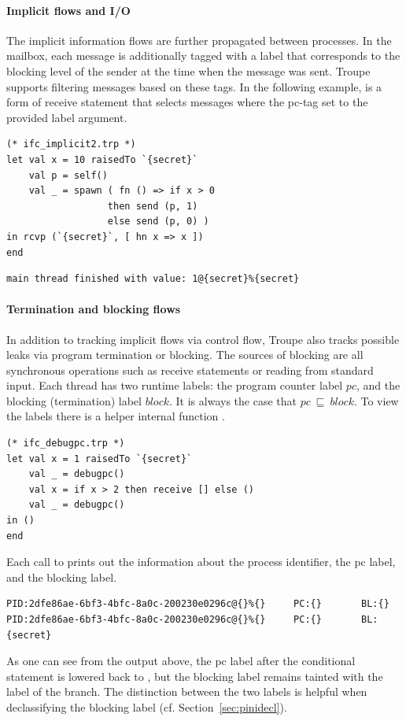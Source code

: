 \paragraph{Implicit flows and I/O}
The implicit information flows are further propagated between processes.
In the mailbox, each message is additionally tagged with a label that
corresponds to the blocking level of the sender at the time when the message was sent.
Troupe supports filtering messages based on these tags.
In the following example,  is a form of receive statement that selects messages
where the pc-tag set to the provided label argument.

\begin{lstlisting}
(* ifc_implicit2.trp *)
let val x = 10 raisedTo `{secret}`
    val p = self()
    val _ = spawn ( fn () => if x > 0
                  then send (p, 1)
                  else send (p, 0) )
in rcvp (`{secret}`, [ hn x => x ])
end
\end{lstlisting}
\begin{verbatim}
main thread finished with value: 1@{secret}%{secret}
\end{verbatim}


\paragraph{Termination and blocking flows}
In addition to tracking implicit flows via control flow, Troupe also
tracks possible leaks via program termination or blocking.
The sources of blocking are all synchronous operations such as receive statements or reading from standard input.
Each thread has two runtime labels: the program counter label $\mathit{pc}$, and
the blocking (termination) label $\mathit{block}$. It is always the case that
$\mathit{pc}~\sqsubseteq~\mathit{block}$. To view the labels there is a
helper internal function .
\begin{lstlisting}
(* ifc_debugpc.trp *)
let val x = 1 raisedTo `{secret}`
    val _ = debugpc()
    val x = if x > 2 then receive [] else ()
    val _ = debugpc()
in ()
end
\end{lstlisting}

Each call to  prints out the information about the process identifier,
the pc label, and the blocking label.
\begin{verbatim}
PID:2dfe86ae-6bf3-4bfc-8a0c-200230e0296c@{}%{}     PC:{}       BL:{}
PID:2dfe86ae-6bf3-4bfc-8a0c-200230e0296c@{}%{}     PC:{}       BL:{secret}
\end{verbatim}
As one can see from the output above, the pc label after the conditional
statement is lowered back to \lev{}, but the blocking label remains tainted
with the label of the branch. The distinction between the two labels
is helpful when declassifying the blocking label (cf. Section~\ref{sec:pinidecl}).


